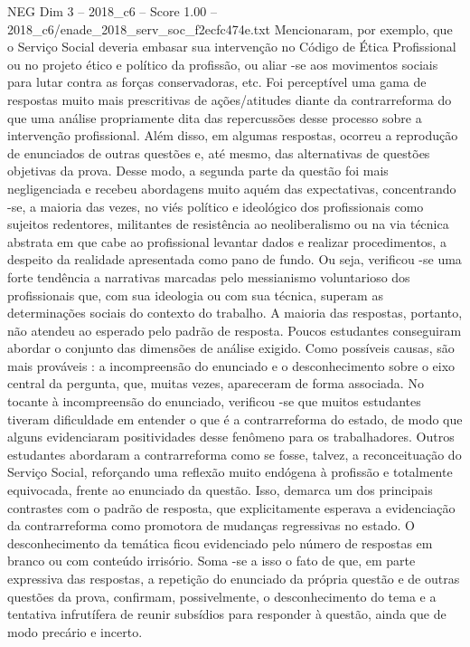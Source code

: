 \begin{textsample}{NEG Dim 3 – 2018\_c6 – Score 1.00 – 2018\_c6/enade\_2018\_serv\_soc\_f2ecfc474e.txt}
Mencionaram, por exemplo, que o Serviço Social deveria embasar sua intervenção no Código de Ética Profissional ou no projeto ético e político da profissão, ou aliar -se aos movimentos sociais para lutar contra as forças conservadoras, etc.
Foi perceptível uma gama de respostas muito mais prescritivas de ações/atitudes diante da contrarreforma do que uma análise propriamente dita das repercussões desse processo sobre a intervenção profissional.
Além disso, em algumas respostas, ocorreu a reprodução de enunciados de outras questões e, até mesmo, das alternativas de questões objetivas da prova.
Desse modo, a segunda parte da questão foi mais negligenciada e recebeu abordagens muito aquém das expectativas, concentrando -se, a maioria das vezes, no viés político e ideológico dos profissionais como sujeitos redentores, militantes de resistência ao neoliberalismo ou na via técnica abstrata em que cabe ao profissional levantar dados e realizar procedimentos, a despeito da realidade apresentada como pano de fundo.
Ou seja, verificou -se uma forte tendência a narrativas marcadas pelo messianismo voluntarioso dos profissionais que, com sua ideologia ou com sua técnica, superam as determinações sociais do contexto do trabalho.
A maioria das respostas, portanto, não atendeu ao esperado pelo padrão de resposta.
Poucos estudantes conseguiram abordar o conjunto das dimensões de análise exigido.
Como possíveis causas, são mais prováveis : a incompreensão do enunciado e o desconhecimento sobre o eixo central da pergunta, que, muitas vezes, apareceram de forma associada.
No tocante à incompreensão do enunciado, verificou -se que muitos estudantes tiveram dificuldade em entender o que é a contrarreforma do estado, de modo que alguns evidenciaram positividades desse fenômeno para os trabalhadores.
Outros estudantes abordaram a contrarreforma como se fosse, talvez, a reconceituação do Serviço Social, reforçando uma reflexão muito endógena à profissão e totalmente equivocada, frente ao enunciado da questão.
Isso, demarca um dos principais contrastes com o padrão de resposta, que explicitamente esperava a evidenciação da contrarreforma como promotora de mudanças regressivas no estado.
O desconhecimento da temática ficou evidenciado pelo número de respostas em branco ou com conteúdo irrisório.
Soma -se a isso o fato de que, em parte expressiva das respostas, a repetição do enunciado da própria questão e de outras questões da prova, confirmam, possivelmente, o desconhecimento do tema e a tentativa infrutífera de reunir subsídios para responder à questão, ainda que de modo precário e incerto.

\end{textsample}
